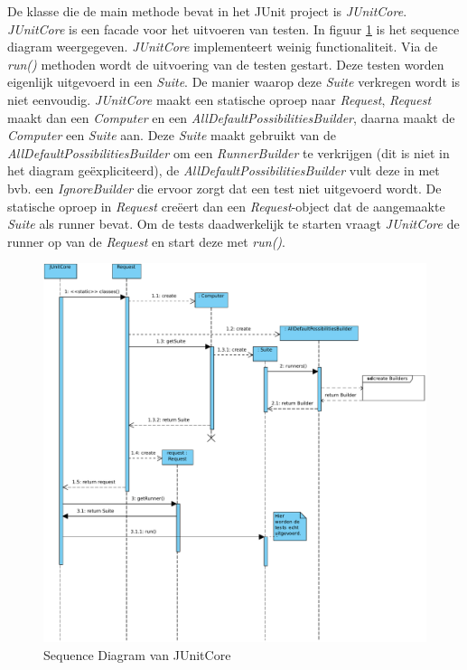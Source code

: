 \documentclass[i1]{oss}
\begin{document}
De klasse die de main methode bevat in het JUnit project is \emph{JUnitCore}. \emph{JUnitCore} is een facade voor het uitvoeren van testen. In figuur \ref{fig:junitsequence} is het sequence diagram weergegeven. \emph{JUnitCore} implementeert weinig functionaliteit. Via de \emph{run()} methoden wordt de uitvoering van de testen gestart. Deze testen worden eigenlijk uitgevoerd in een \emph{Suite}. De manier waarop deze \emph{Suite} verkregen wordt is niet eenvoudig. \emph{JUnitCore} maakt een statische oproep naar \emph{Request}, \emph{Request} maakt dan een \emph{Computer} en een \emph{AllDefaultPossibilitiesBuilder}, daarna maakt de \emph{Computer} een \emph{Suite} aan. Deze \emph{Suite} maakt gebruikt van de \emph{AllDefaultPossibilitiesBuilder} om een \emph{RunnerBuilder} te verkrijgen (dit is niet in het diagram ge\"expliciteerd), de \emph{AllDefaultPossibilitiesBuilder} vult deze in met bvb. een \emph{IgnoreBuilder} die ervoor zorgt dat een test niet uitgevoerd wordt. De statische oproep in \emph{Request} cre\"eert dan een \emph{Request}-object dat de aangemaakte \emph{Suite} als runner bevat. Om de tests daadwerkelijk te starten vraagt \emph{JUnitCore} de runner op van de \emph{Request} en start deze met \emph{run()}.


\begin{figure}[h!]
	\centering
	\includegraphics[width=\textwidth]{JUnitCoreSequenceDiagram}
	\caption{Sequence Diagram van JUnitCore}
	\label{fig:junitsequence}
\end{figure}
\end{document}
